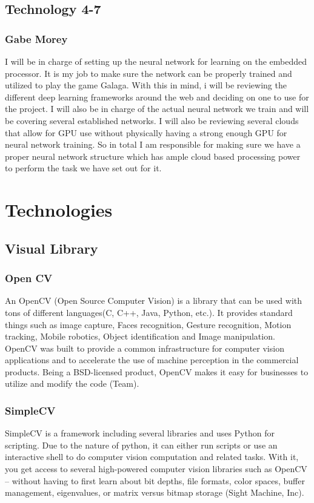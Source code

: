 \documentclass{scrreprt}
\begin{document}
\section{Technology 4-7}
\subsection{Gabe Morey}
I will be in charge of setting up the neural network for learning on the embedded processor. It is
my job to make sure the network can be properly trained and utilized to play the game Galaga.
With this in mind, i will be reviewing the different deep learning frameworks around the web
and deciding on one to use for the project. I will also be in charge of the actual neural network
we train and will be covering several established networks. I will also be reviewing several
clouds that allow for GPU use without physically having a strong enough GPU for neural
network training. So in total I am responsible for making sure we have a proper neural network
structure which has ample cloud based processing power to perform the task we have set out for
it.

\chapter{Technologies}
\section{Visual Library}
\subsection{Open CV}
An OpenCV (Open Source Computer Vision) is a library that can be used with tons of different languages(C, C++, Java, Python, etc.).
 It provides standard things such as image capture, Faces recognition, Gesture recognition, Motion tracking, Mobile robotics, Object identification and Image manipulation.
 OpenCV was built to provide a common infrastructure for computer vision applications and to accelerate the use of machine perception in the commercial products.
 Being a BSD-licensed product, OpenCV makes it easy for businesses to utilize and modify the code (Team).
\subsection{SimpleCV}
SimpleCV is a framework including several libraries and uses Python for scripting.
Due to the nature of python, it can either run scripts or use an interactive shell to do computer vision computation and related tasks.
With it, you get access to several high-powered computer vision libraries such as OpenCV – without having to first learn about bit depths,
file formats, color spaces, buffer management, eigenvalues, or matrix versus bitmap storage (Sight Machine, Inc).
\end{document}
